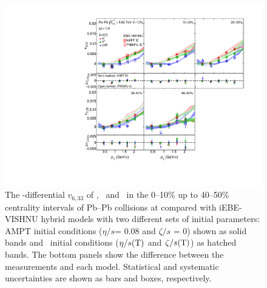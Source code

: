 \begin{figure}[h]
\begin{center}
\includegraphics[scale=0.73]{figures/model/TrentoAndAMPT_v633_gap00_PID2.pdf}
\end{center}
\caption{The \pT-differential $v_{6,33}$ of \pion, \kaon~and \proton~in the 0--10\% up to 40--50\% centrality intervals of Pb--Pb collisions at \sNN compared with iEBE-VISHNU hybrid models with two different sets of initial parameters: AMPT initial conditions ($\eta/s$= 0.08 and $\zeta/s$ = 0) shown as solid bands and \trento~initial conditions ($\eta/s({\rm T})$ and $\zeta/s({\rm T})$) as hatched bands. The bottom panels show the difference between the measurements and each model. Statistical and systematic uncertainties are shown as bars and boxes, respectively.}
\label{v633_model}
\end{figure}

